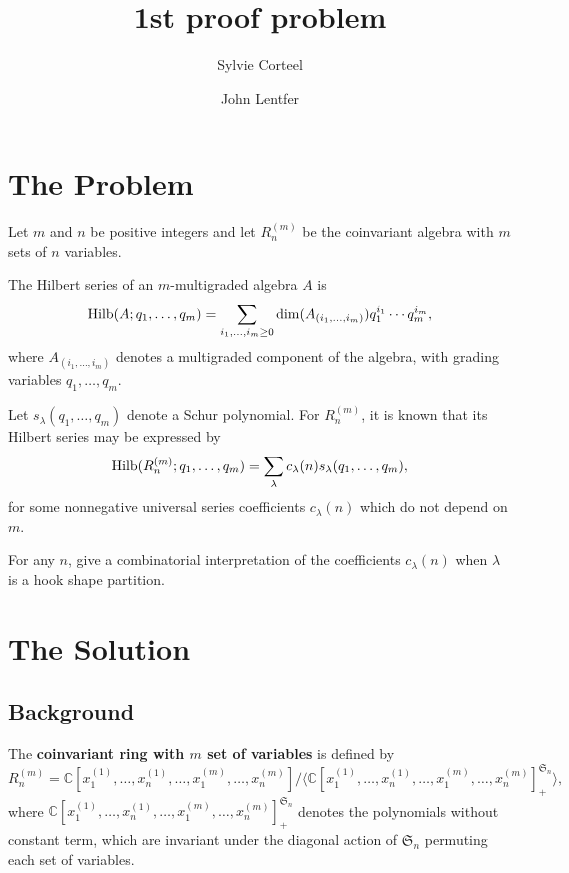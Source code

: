 \documentclass[11pt]{amsart}
\theoremstyle{definition}
\newcommand{\0}{\emptyset}
\newcommand{\C}{\mathbb{C}}
\begin{document}
\title{1st proof problem}

\author[S. Corteel]{Sylvie Corteel}
\address{Department of Mathematics\\
         University of California, Berkeley, CA, USA}

\author[J. Lentfer]{John Lentfer}
\address{Department of Mathematics\\
         University of California, Berkeley, CA, USA}


\maketitle

\section{The Problem}

Let $m$ and $n$ be positive integers and let $R_n^{(m)}$ be the coinvariant algebra with $m$ sets of $n$ variables.

The Hilbert series of an $m$-multigraded algebra $A$ is
$$
{\rm Hilb}(A;q_1,\ldots ,q_m)= \sum_{i_1,\ldots,i_m \geq 0} \dim(A_{(i_1,\ldots,i_m)})q_1^{i_1} \cdots q_m^{i_m},
$$
where $A_{(i_1,\ldots,i_m)}$ denotes a multigraded component of the algebra, with grading variables $q_1,\ldots, q_m$.

Let $s_\lambda(q_1,\ldots ,q_m)$ denote a Schur polynomial. For $R_n^{(m)}$, it is known that its Hilbert series may be expressed by 
$$
{\rm Hilb}(R_n^{(m)};q_1,\ldots ,q_m)= \sum_{\lambda}
c_{\lambda}(n)s_\lambda(q_1,\ldots ,q_m),
$$
for some nonnegative universal series coefficients $c_\lambda(n)$ which do not depend on $m$.

For any $n$, give a combinatorial interpretation of the coefficients $c_{\lambda}(n)$ when $\lambda$ is a hook shape partition.

\section{The Solution}
\subsection{Background}

The \textbf{coinvariant ring with $m$ set of variables} is defined by
\begin{equation}\label{eq:m-coinv} R_n^{(m)} = \C[x_1^{(1)},\ldots,x_n^{(1)},\ldots, x_1^{(m)}, \ldots,x_n^{(m)}]/\langle \C[x_1^{(1)},\ldots,x_n^{(1)},\ldots, x_1^{(m)}, \ldots,x_n^{(m)}]_+^{\mathfrak{S}_n} \rangle,\end{equation}
where $\C[x_1^{(1)},\ldots,x_n^{(1)},\ldots, x_1^{(m)}, \ldots,x_n^{(m)}]_+^{\mathfrak{S}_n}$ denotes the polynomials without constant term, which are invariant under the diagonal action of $\mathfrak{S}_n$ permuting each set of variables.
\end{document}
